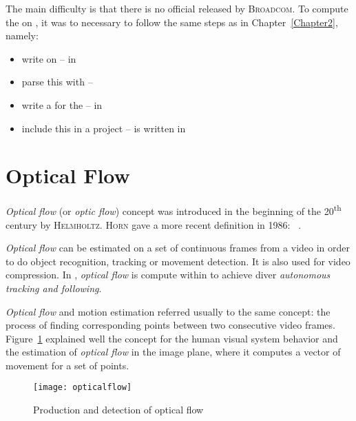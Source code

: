 The main difficulty is that there is no official  released by \textsc{Broadcom}. To compute the  on \rasp, it was to necessary to follow the same steps as in Chapter~\ref{Chapter2}, namely:
\begin{itemize}
	\item write  on  -- in 
	\item parse this  with  -- 
	\item write a  for the  -- in 
	\item include this  in a  project --  is written in 
\end{itemize}


\section{Optical Flow}

\emph{Optical flow} (or \emph{optic flow}) concept was introduced in the beginning of the 20\textsuperscript{th} century by \textsc{Helmholtz}. \textsc{Horn} gave a more recent definition in 1986: ~\cite{horn}.\par

\emph{Optical flow} can be estimated on a set of continuous frames from a video in order to do object recognition, tracking or movement detection. It is also used for video compression. In \iBubble, \emph{optical flow} is compute within  to achieve diver \emph{autonomous tracking and following}.\par


\emph{Optical flow} and motion estimation referred usually to the same concept: the process of finding corresponding points between two consecutive video frames. Figure~\ref{opticalflow_detection} explained well the concept for the human visual system behavior and the estimation of \emph{optical flow} in the image plane, where it computes a vector of movement for a set of points.\par

\begin{figure}[h]
\centering
\texttt{[image: opticalflow]}
\caption{Production and detection of optical flow \cite{optical_flow_scholarpedia}}
\label{opticalflow_detection}
\end{figure}
\FloatBarrier

